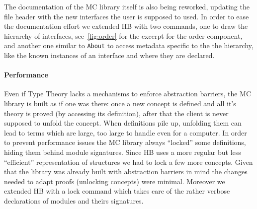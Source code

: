 \documentclass{easychair}
\def\MC{{\sf MC}}
\def\HB{{\sf HB}}
\begin{document}
The documentation of the \MC{} library itself is also being reworked, updating
the file header with the new interfaces the user is supposed to used.
In order to ease the documentation effort we extended \HB{} with two commands,
one to draw the hierarchy of interfaces, see~\ref{fig:order} for the excerpt
for the order component, and another one similar to \verb+About+ to access
metadata specific to the the hierarchy, like the known instances of an interface
and where they are declared.
% 
% 
\paragraph{Performance}

Even if Type Theory lacks a mechanisms to enforce abstraction barriers,
the \MC{} library is built as if one was there: once a new concept is defined
and all it's theory is proved (by accessing its definition), after that the client
is never supposed to unfold the concept. When definitions pile up, unfolding
them can lead to terms which are large, too large to handle even for a computer.
In order to prevent performance issues the \MC{} library always ``locked''
some definitions, hiding them behind module signatures.
Since \HB{} uses a more regular but less ``efficient'' representation of
structures we had to lock a few more concepts. Given that the library
was already built with abstraction barriers in mind the changes needed to adapt
proofs (unlocking concepts) were minimal. Moreover we extended \HB{} with
a lock command which takes care of the rather verbose declarations of modules
and theirs signatures.
\end{document}
